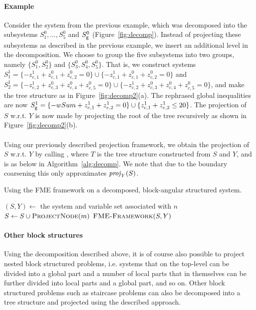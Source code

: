 \paragraph{Example}
Consider the system from the previous example, which was decomposed into the subsystems $S^0_1, \ldots, S^0_5$ and $S^0_{\texttt{g}}$ (Figure~\ref{fig:decomp}). Instead of projecting these subsystems as described in the previous example, we insert an additional level in the decomposition. We choose to group the five subsystems into two groups, namely $\{S^0_1, S^0_2\}$ and $\{S^0_3, S^0_4, S^0_5\}$. 
That is, we construct systems $S^1_1=\{-z^1_{e,1} + z^0_{e,1}+z^0_{e,2} = 0\}\cup \{-z^1_{c,1} + z^0_{c,1}+z^0_{c,2} = 0\}$ and $S^1_2=\{-z^1_{e,2} +z^0_{e,3}+ z^0_{e,4}+z^0_{e,5} = 0\}\cup \{-z^1_{c,2} +z^0_{c,3}+ z^0_{c,4}+z^0_{c,5} = 0\}$, and make the tree structure as in Figure~\ref{fig:decomp2}(a). The rephrased global inequalities are now $S_{\texttt{g}}^1 = \{-wSum + z^1_{e,1} + z^1_{e,2} = 0 \} \cup \{ z^1_{c,1} + z^1_{e,2} \leq 20\}$.   
%
The projection of $S$ w.r.t. $Y$ is now made by projecting the root of the tree recursively as shown in Figure~\ref{fig:decomp2}(b). 
\\
\\
Using our previously described projection framework, we obtain the projection of $S$ w.r.t. $Y$ by calling , where $T$ is the tree structure constructed from $S$ and $Y$, and  is as below in Algorithm~\ref{alg:decomp}. We note that due to the boundary coarsening this only approximates $\mathit{proj}_Y(S)$.

\begin{algorithm}
\caption{{Using the FME framework on a decomposed, block-angular structured system.}}
\label{alg:decomp}
\begin{algorithmic}
	\State $(S,Y)\gets$ the system and variable set associated with $n$
		\State \Return {}
	\Else
			\State $S \gets S\cup \Call{ProjectNode}{m}$
		\EndFor
		\State \Return $\Call{FME-Framework}{S, Y}$
	\EndIf
\EndFunction
\end{algorithmic}
\end{algorithm}

\paragraph{Other block structures} 
Using the decomposition described above, it is of course also possible to project nested block structured problems, i.e. systems that on the top-level can be divided into a global part and a number of local parts that in themselves can be further divided into local parts and a global part, and so on.  
Other block structured problems such as staircase problems can also be decomposed into a tree structure and projected using the described approach. 


